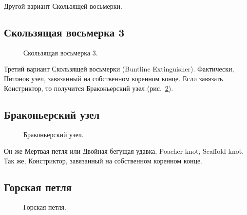 Другой вариант Скользящей восьмерки.

\subsection{Скользящая восьмерка 3}

\begin{figure}[H]\centering
	\begin{minipage}{1\linewidth}
		\begin{center}
			\tcbox[enhanced jigsaw,colframe=black,opacityframe=0.5,opacityback=0.5]
			{\centering{}}
		\end{center}
	\end{minipage}
\caption{Скользящая восьмерка 3.}
\label{ris:Sliding_figure_of_eight_3}
\end{figure}


Третий вариант Скользящей восьмерки (Buntline Extinguisher). Фактически, Питонов узел, завязанный на собственном коренном конце. Если завязать Констриктор, то получится Браконьерский узел (рис.~\ref{ris:Brakonersky}).

\subsection{Браконьерский узел}

\begin{figure}[H]\centering
	\begin{minipage}{1\linewidth}
		\begin{center}
			\tcbox[enhanced jigsaw,colframe=black,opacityframe=0.5,opacityback=0.5]
			{\centering{}}
		\end{center}
	\end{minipage}
\caption{Браконьерский узел.}
\label{ris:Brakonersky}
\end{figure}

Он же Мертвая петля или Двойная бегущая удавка, Poacher knot, Scaffold knot. Так же, Констриктор, завязанный на собственном коренном конце.

\subsection{Горская петля}

\begin{figure}[H]\centering
	\begin{minipage}{1\linewidth}
		\begin{center}
			\tcbox[enhanced jigsaw,colframe=black,opacityframe=0.5,opacityback=0.5]
			{\centering{}}
		\end{center}
	\end{minipage}
\caption{Горская петля.}
\label{ris:Gorskaya}
\end{figure}

